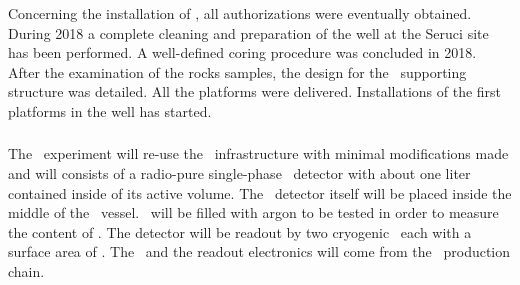 
Concerning the installation of \SeruciOne, all  authorizations were eventually obtained.  During  2018 a complete cleaning and preparation of the well at the Seruci site has been performed.  A well-defined coring procedure was concluded in 2018. After the examination of the rocks samples, the design for the \SeruciOne\ supporting structure was detailed. All the platforms were delivered. Installations of the first platforms in the well has started.



\subsubsection{\DArT} 
The \DArT\ experiment will re-use the \ArDM\ infrastructure with minimal modifications made and will consists of a radio-pure single-phase \LAr\ detector with about one liter contained inside of its active volume.  The \DArT\ detector itself will be placed inside the middle of the \ArDM\ vessel.  \DArT\ will be filled with argon to be tested in order to measure the content of .  The detector will be readout by two cryogenic \SiPMs\ each with a surface area of \DSkSiPMAreaMaxcm.  The \SiPMs\ and the readout electronics will come from the \DSks\ production chain. 

